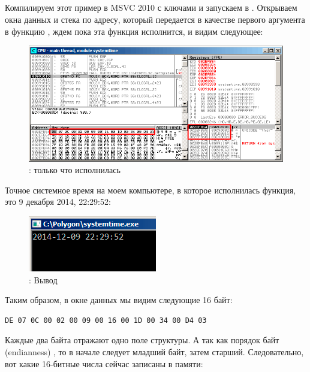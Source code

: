 ﻿\clearpage
\subsection{\olly}
\myindex{\olly}

Компилируем этот пример в MSVC 2010 с ключами  и запускаем в \olly.
Открываем окна данных и стека по адресу, который передается в качестве первого аргумента в функцию , 
ждем пока эта функция исполнится, и видим следующее:

\begin{figure}[H]
\centering
\includegraphics[scale=\FigScale]{patterns/15_structs/1_systemtime/olly_systemtime1.png}
\caption{\olly:  только что исполнилась}
\label{fig:struct_olly_1}
\end{figure}

Точное системное время на моем компьютере, в которое исполнилась функция, это 9 декабря 2014, 22:29:52:

\begin{figure}[H]
\centering
\includegraphics[scale=\NormalScale]{patterns/15_structs/1_systemtime/olly_systemtime2.png}
\caption{\olly: Вывод \printf}
\label{fig:struct_olly_2}
\end{figure}

Таким образом, в окне данных мы видим следующие 16 байт: 
\begin{lstlisting}
DE 07 0C 00 02 00 09 00 16 00 1D 00 34 00 D4 03
\end{lstlisting}

Каждые два байта отражают одно поле структуры. 
А так как порядок байт (\gls{endianness}) ,
то в начале следует младший байт, затем старший.
Следовательно, вот какие 16-битные числа сейчас записаны в памяти:

